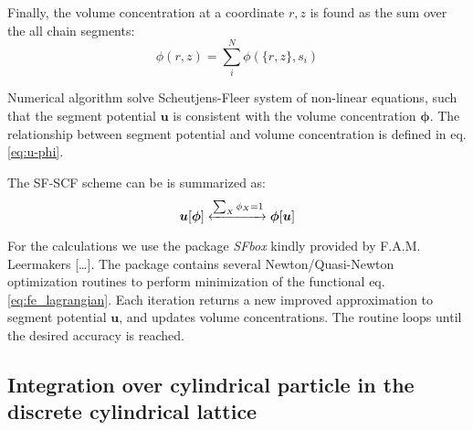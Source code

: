 \documentclass[10pt, a4paper]{article}
\begin{document}
\begin{multicols}{2}
Finally, the volume concentration at a coordinate $r, z$ is found as the sum over the all chain segments:
\begin{equation}
    \phi(r, z) = \sum_{i}^{N} \phi(\{r, z\}, s_{i})
\end{equation}

Numerical algorithm solve Scheutjens-Fleer system of non-linear equations, such that the segment potential $\mathbf{u}$ is consistent with the volume concentration $\mathbf{\phi}$.
The relationship between segment potential and volume concentration is defined in eq. \ref{eq:u-phi}.

The SF-SCF scheme can be is summarized as:
\begin{equation}
    \bm{u}[\bm{\phi}] \xleftrightarrow[]{\sum_{X} \phi_X = 1} \bm{\phi}[\bm{u}]
\end{equation}

For the calculations we use the package \emph{SFbox} kindly provided by F.A.M. Leermakers [\dots].
The package contains several Newton/Quasi-Newton optimization routines to perform minimization of the functional eq.\ref{eq:fe_lagrangian}.
Each iteration returns a new improved approximation to segment potential $\mathbf{u}$, and updates volume concentrations.
The routine loops until the desired accuracy is reached.

\end{multicols}
\subsection*{Integration over cylindrical particle in the discrete cylindrical lattice}
\end{document}
